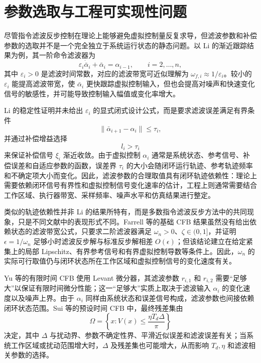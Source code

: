 \documentclass[UTF8,a4paper,11pt,fontset=fandol]{ctexart}
\begin{document}
\section{参数选取与工程可实现性问题}

尽管指令滤波反步控制在理论上能够避免虚拟控制量反复求导，但滤波参数和补偿参数的选取并不是一个完全独立于系统运行状态的静态问题。以 Li 的渐近跟踪结果为例，其一阶命令滤波器为
\begin{equation}
  \varepsilon_i\dot{\bar{\alpha}}_i+\bar{\alpha}_i=\alpha_{i-1},
  \qquad i=2,\ldots,n ,
\end{equation}
其中 $\varepsilon_i>0$ 是滤波时间常数，对应的滤波带宽可近似理解为 $\omega_{f,i}\approx 1/\varepsilon_i$。较小的 $\varepsilon_i$ 能提高滤波带宽，使 $\bar{\alpha}_i$ 更快跟踪虚拟控制输入，但也会提高对噪声和快速变化信号的敏感性，并可能导致控制输入幅值或变化率增大。

Li 的稳定性证明并未给出 $\varepsilon_i$ 的显式闭式设计公式，而是要求滤波误差满足有界条件
\begin{equation}
  \|\bar{\alpha}_{i+1}-\alpha_i\|\le \tau_i ,
\end{equation}
并通过补偿增益选择
\begin{equation}
  l_i>\tau_i
\end{equation}
来保证补偿信号 $\xi_i$ 渐近收敛。由于虚拟控制 $\alpha_i$ 通常是系统状态、参考信号、补偿误差和自适应参数的函数，误差界 $\tau_i$ 的大小会随闭环运行轨迹、参考轨迹频率和不确定项大小而变化。因此，滤波参数的合理取值具有闭环轨迹依赖性：理论上需要依赖闭环信号有界性和虚拟控制信号变化速率的估计，工程上则通常需要结合工作区域、执行器带宽、采样频率、噪声水平和仿真结果进行整定。

类似的轨迹依赖性并非 Li 的结果所特有，而是多数指令滤波反步方法中的共同现象，只是不同文献中的表现形式不同。Farrell 等的基础 CFB 结果虽然没有给出依赖状态的滤波带宽公式，只要求二阶滤波器满足 $\omega_n>0$、$\zeta\in(0,1]$，并证明 $\epsilon=1/\omega_n$ 足够小时滤波反步解与标准反步解相差 $O(\epsilon)$；但该结论建立在给定紧集上的局部 Lipschitz、有界参考信号和有界虚拟控制导数等条件上。因此，$\omega_n$ 的实际可行取值仍与闭环状态所在工作区域和虚拟控制信号的变化速度有关。

Yu 等的有限时间 CFB 使用 Levant 微分器，其滤波参数 $r_{i,1}$ 和 $r_{i,2}$ 需要``足够大''以保证有限时间微分性能；这一``足够大''实质上取决于滤波输入 $\alpha_i$ 的变化速度以及噪声上界。由于 $\alpha_i$ 同样由系统状态和误差信号构成，滤波参数也间接依赖闭环状态范围。Sui 等的预设时间 CFB 中，最终残差集由
\begin{equation}
  \Omega=\left\{x:V(x)\le \frac{\eta T_d\Delta}{\pi}\right\}
\end{equation}
决定，其中 $\Delta$ 与扰动界、参数不确定性界、平滑近似误差和滤波误差有关；当系统工作区域或扰动范围增大时，$\Delta$ 及残差集也可能增大，从而影响 $T_d,\eta$ 和滤波相关参数的选择。
\end{document}
